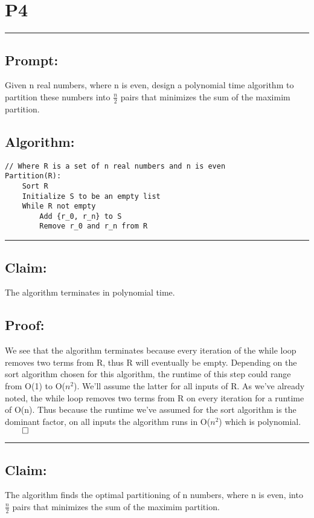 \documentclass[11pt]{article}
\title{}
\author{}
\date{}
\begin{document}
\section*{P4}

\noindent\textcolor[RGB]{220,220,220}{\rule{\linewidth}{0.8pt}}

\subsection*{Prompt:} 
Given n real numbers, where n is even, design a polynomial time algorithm to partition these numbers into $\frac{n}{2}$ pairs that minimizes the sum of the maximim partition. 

\subsection*{Algorithm:} 
\begin{lstlisting}[basicstyle=\small]
// Where R is a set of n real numbers and n is even
Partition(R):
	Sort R
	Initialize S to be an empty list
	While R not empty
		Add {r_0, r_n} to S
		Remove r_0 and r_n from R
\end{lstlisting}

\noindent\textcolor[RGB]{220,220,220}{\rule{\linewidth}{0.8pt}}
\linebreak

\subsection*{Claim:} 
The algorithm terminates in polynomial time.

\subsection*{Proof:}
We see that the algorithm terminates because every iteration of the while loop removes two terms from R, thus R will eventually be empty. Depending on the sort algorithm chosen for this algorithm, the runtime of this step could range from O(1) to O($n^2$). We'll assume the latter for all inputs of R. As we've already noted, the while loop removes two terms from R on every iteration for a runtime of O(n). Thus because the runtime we've assumed for the sort algorithm is the dominant factor, on all inputs the algorithm runs in O($n^2$) which is polynomial. $\qed$

\noindent\textcolor[RGB]{220,220,220}{\rule{\linewidth}{0.8pt}}

\subsection*{Claim:} 
The algorithm finds the optimal partitioning of n numbers, where n is even, into $\frac{n}{2}$ pairs that minimizes the sum of the maximim partition.
\end{document}
